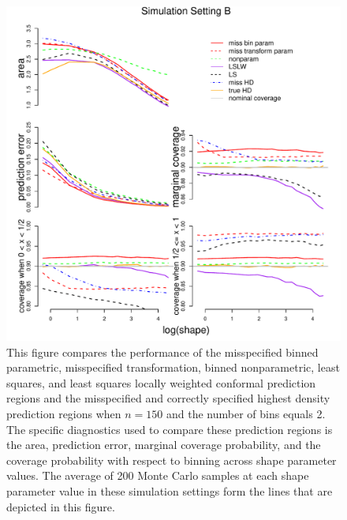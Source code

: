 \documentclass[11pt]{article}\usepackage[]{graphicx}\usepackage[]{color}
\makeatletter
\def\maxwidth{ %
  \ifdim\Gin@nat@width>\linewidth
    \linewidth
  \else
    \Gin@nat@width
  \fi
}
\newenvironment{knitrout}{}{} %
\makeatother
\begin{document}
\newpage
\begin{figure}[h!]
\begin{center}
\begin{knitrout}
\color{fgcolor}
\includegraphics[width=\maxwidth]{figure/Fig-misspec-150-1} 

\end{knitrout}
\end{center}
\caption{This figure compares the performance of the 
  misspecified binned parametric,
  misspecified transformation,  
  binned nonparametric,
  least squares, and 
  least squares locally weighted conformal prediction regions and the 
  misspecified and correctly specified highest density prediction regions 
  when $n = 150$ and the number of bins equals 2.  
  The specific diagnostics used to compare these prediction regions is the 
    area,
    prediction error, 
    marginal coverage probability, 
    and the coverage probability with respect to binning  
    across shape parameter values.
  The average of 200 Monte Carlo samples at each shape parameter value in 
  these simulation settings form the lines that are depicted in this figure.}
\label{Fig:misspec.150}
\end{figure}
\end{document}
